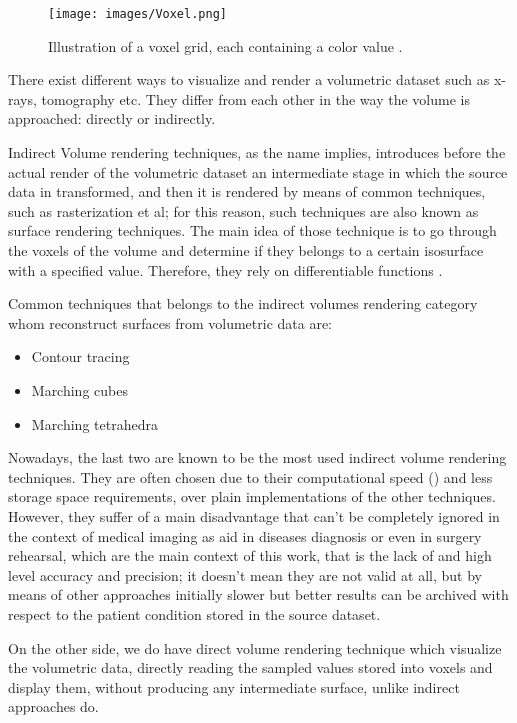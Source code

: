 \documentclass[12pt,a4paper]{extarticle}
\newcommand{\linespace}{\vspace{0pt}}
\begin{document}
\begin{figure}[hbtp]
\centering
\texttt{[image: images/Voxel.png]}
\caption{Illustration of a voxel grid, each containing a color value \cite{wiki_voxel}.}
\label{fig:voxel}
\end{figure}

There exist different ways to visualize and render a volumetric dataset such as x-rays, tomography etc. They differ from each other in the way the volume is approached: directly or indirectly.
\linespace

Indirect Volume rendering techniques, as the name implies, introduces before the actual render of the volumetric dataset an intermediate stage in which the source data in transformed, and then it is rendered by means of common techniques, such as rasterization et al; for this reason, such techniques are also known as surface rendering techniques.
The main idea of those technique is to go through the voxels of the volume and determine if they belongs to a certain isosurface with a specified value. Therefore, they rely on differentiable functions \cite{levoy_1988:4}.


Common techniques that belongs to the indirect volumes rendering category whom reconstruct surfaces from volumetric data are:
\begin{itemize}
\item Contour tracing
\item Marching cubes
\item Marching tetrahedra
\end{itemize}

Nowadays, the last two are known to be the most used indirect volume rendering techniques.
They are often chosen due to their computational speed (\cite{volume_vis_5:1})
and less storage space requirements, over plain implementations of the other techniques. However, they suffer of a main disadvantage that can't be completely ignored in the context of medical imaging as aid in diseases diagnosis or even in surgery rehearsal, which are the main context of this work, that is the lack of and high level accuracy and precision; it doesn't mean they are not valid at all, but by means of other approaches initially slower but better results can be archived with respect to the patient condition stored in the source dataset.  

On the other side, we do have direct volume rendering technique which visualize the volumetric data, directly reading the sampled values stored into voxels and display them, without producing any intermediate surface, unlike indirect approaches do. 
\linespace
\end{document}
